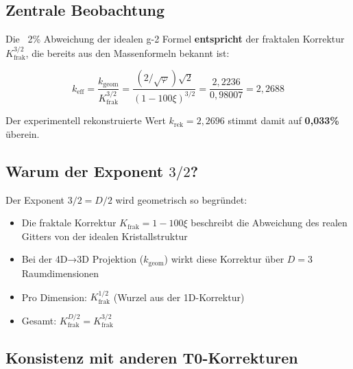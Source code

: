 	\subsection{Zentrale Beobachtung}
	
	Die ~2\% Abweichung der idealen g-2 Formel \textbf{entspricht} der fraktalen Korrektur $K_\text{frak}^{3/2}$, die bereits aus den Massenformeln bekannt ist:
	
	\begin{equation}
		\boxed{k_\text{eff} = \frac{k_\text{geom}}{K_\text{frak}^{3/2}} = \frac{(2/\sqrt{\varphi})\sqrt{2}}{(1-100\xi)^{3/2}} = \frac{2{,}2236}{0{,}98007} = 2{,}2688}
	\end{equation}
	
	Der experimentell rekonstruierte Wert $k_\text{rek} = 2{,}2696$ stimmt damit auf \textbf{0{,}033\%} überein.
	
	\subsection{Warum der Exponent $3/2$?}
	
	Der Exponent $3/2 = D/2$ wird geometrisch so begründet:
	\begin{itemize}
		\item Die fraktale Korrektur $K_\text{frak} = 1 - 100\xi$ beschreibt die Abweichung des realen Gitters von der idealen Kristallstruktur
		\item Bei der 4D→3D Projektion ($k_\text{geom}$) wirkt diese Korrektur über $D = 3$ Raumdimensionen
		\item Pro Dimension: $K_\text{frak}^{1/2}$ (Wurzel aus der 1D-Korrektur)
		\item Gesamt: $K_\text{frak}^{D/2} = K_\text{frak}^{3/2}$
	\end{itemize}
	
	\subsection{Konsistenz mit anderen T0-Korrekturen}
	
	\begin{table}[h]
		\centering
		\caption{Universelle fraktale Korrektur mit kontextabhängigem Exponenten}
	\end{table}
	
